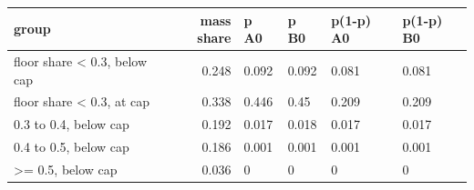 \begingroup\small
\setlength{\tabcolsep}{3pt}
\renewcommand{\arraystretch}{1.04}
\begin{tabularx}{\linewidth}{XrXXXX}
\toprule
group & mass share & p A0 & p B0 & p(1-p) A0 & p(1-p) B0 \\
\midrule
floor share \textless{} 0.3, below cap & 0.248 & 0.092 & 0.092 & 0.081 & 0.081 \\
floor share \textless{} 0.3, at cap & 0.338 & 0.446 & 0.45 & 0.209 & 0.209 \\
0.3 to 0.4, below cap & 0.192 & 0.017 & 0.018 & 0.017 & 0.017 \\
0.4 to 0.5, below cap & 0.186 & 0.001 & 0.001 & 0.001 & 0.001 \\
\textgreater{}= 0.5, below cap & 0.036 & 0 & 0 & 0 & 0 \\
\bottomrule
\end{tabularx}
\endgroup
